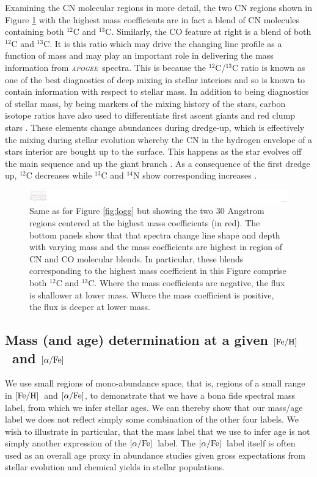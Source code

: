 \documentclass[12pt, preprint]{aastex}
\newcommand{\project}[1]{\textsl{#1}}
\newcommand{\apogee}{\project{\textsc{apogee}}}
\newcommand{\feh}{\mbox{$\rm [Fe/H]$}}
\newcommand{\alphafe}{\mbox{$\rm [\alpha/Fe]$}}
\begin{document}
Examining the CN molecular regions in more detail, the two CN regions shown in Figure \ref{fig:mass} with the highest mass coefficients are in fact a blend of CN molecules containing both $^{12}$C and $^{13}$C. Similarly, the CO feature at right is a blend of both $^{12}$C and $^{13}$C. It is this ratio which may drive the changing line profile as a function of mass and may play an important role in delivering the mass information from \apogee\ spectra. This is because the $^{12}$C/$^{13}$C ratio is known as one of the best diagnostics of deep mixing in stellar interiors and so is known to contain information with respect to stellar mass.  In addition to being diagnostics of stellar mass, by being markers of the mixing history of the stars, carbon isotope ratios have also used to differentiate first ascent giants and red clump stars \citep[see][and references therein]{Taut2013}. These elements change abundances during dredge-up, which is effectively the mixing during stellar evolution whereby the CN in the hydrogen envelope of a stars interior are bought up to the surface. This happens as the star evolves off the main sequence and up the giant branch \citep{Gilroy1991}. As a consequence of the first dredge up, $^{12}$C decreases while $^{13}$C and $^{14}$N show corresponding increases \citep{Taut2010}. 


\begin{figure}[p]
\centering
    \includegraphics[scale=0.51]{./plots/coeffs_m_3.png}
  \caption{Same as for Figure \ref{fig:logg} but showing the two 30 Angstrom regions centered at the highest mass coefficients (in red). The bottom panels show that that spectra change line shape and depth with varying mass and the mass coefficients are highest in region of CN and CO molecular blends. In particular, these blends corresponding to the highest mass coefficient in this Figure comprise both $^{12}$C and $^{13}$C. Where the mass coefficients are negative, the flux is shallower at lower mass. Where the mass coefficient is positive, the flux is deeper at lower mass.}
\label{fig:mass}
\end{figure}


\subsection{Mass (and age) determination at a given \feh\ and \alphafe}

We use small regions of mono-abundance space, that is, regions of a small range in \feh\ and \alphafe, to demonstrate that we have a bona fide spectral mass label, from which we infer stellar ages. We can thereby show that our mass/age label we does not reflect simply some combination of the other four labels. We wish to illustrate in particular, that the mass label that we use to infer age is not simply another expression of the \alphafe\ label. The \alphafe\ label itself is often used as an overall age proxy in abundance studies given gross expectations from stellar evolution and chemical yields in stellar populations. 
\end{document}

